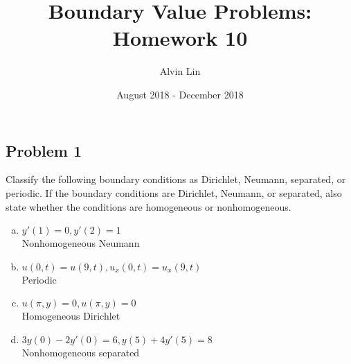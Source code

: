 \documentclass{math}
\title{Boundary Value Problems: Homework 10}
\author{Alvin Lin}
\date{August 2018 - December 2018}
\begin{document}
\maketitle

\subsection*{Problem 1}
Classify the following boundary conditions as Dirichlet, Neumann, separated, or
periodic. If the boundary conditions are Dirichlet, Neumann, or separated, also
state whether the conditions are homogeneous or nonhomogeneous.
\begin{enumerate}[(a)]
  \item \( y'(1) = 0, y'(2) = 1 \) \\
  Nonhomogeneous Neumann
  \item \( u(0,t) = u(9,t), u_x(0,t) = u_x(9,t) \) \\
  Periodic
  \item \( u(\pi,y) = 0, u(\pi,y) = 0 \) \\
  Homogeneous Dirichlet
  \item \( 3y(0)-2y'(0) = 6, y(5)+4y'(5) = 8 \) \\
  Nonhomogeneous separated
\end{enumerate}
\end{document}
